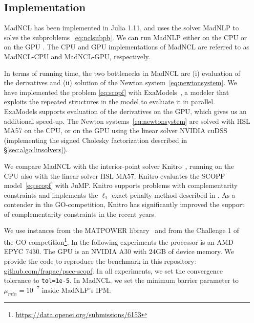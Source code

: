 \documentclass{IEEEtran4PSCC}
\newcommand{\add}[1]{#1}
\begin{document}
\subsection{Implementation}
\label{sec:numerics:implementation}

MadNCL has been implemented in Julia 1.11, and uses the solver MadNLP to solve
the subproblems~\eqref{eq:nclsubpb}. We can run MadNLP either on the CPU or on the GPU \cite{shin2024accelerating}.
The CPU and GPU implementations of MadNCL are referred to as MadNCL-CPU and MadNCL-GPU, respectively.

In terms of running time, the two bottlenecks in MadNCL are (i) evaluation of the derivatives
and (ii) solution of the Newton system~\eqref{eq:newtonsystem}.
We have implemented the problem \eqref{eq:scopf} with ExaModels~\cite{shin2024accelerating},
a modeler that exploits the repeated structures in the model to evaluate it in parallel.
ExaModels supports evaluation of the derivatives on the GPU, which gives us an additional speed-up.
The Newton systems~\eqref{eq:newtonsystem} are solved with HSL MA57 on the CPU, or on
the GPU using the linear solver NVIDIA cuDSS (implementing the signed Cholesky factorization
described in \S\ref{sec:algo:linsolvers}).

We compare MadNCL with the interior-point solver Knitro~\cite{waltz2006interior},
running on the CPU also with the linear solver HSL MA57. Knitro evaluates the SCOPF model~\eqref{eq:scopf}
with JuMP. Knitro supports problems with complementarity constraints and implements the $\ell_1$-exact penalty
method described in \cite{leyffer2006interior}.
As a contender in the GO-competition, Knitro has significantly improved the support of complementarity constraints in the recent years.

We use instances from the MATPOWER library~\cite{zimmerman2010matpower} and
\add{from the Challenge 1 of the GO competition}\footnote{\url{https://data.openei.org/submissions/6153}}.
In the following experiments the processor is an AMD EPYC 7430.
The GPU is an NVIDIA A30 with 24GB of device memory.
We provide the code to reproduce the benchmark in this repository: \url{github.com/frapac/pscc-scopf}.
In all experiments, we set the convergence tolerance to {\tt tol=1e-5}.
In MadNCL, we set the minimum barrier parameter to $\mu_{min} = 10^{-7}$ inside MadNLP's IPM.
\end{document}
